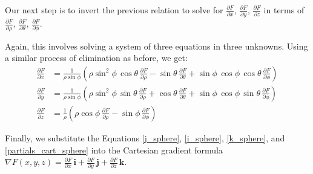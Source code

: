 {Our next step is to invert the previous relation to solve for $\frac{\partial F}{\partial x}$, $\frac{\partial F}{\partial y}$, $\frac{\partial F}{\partial z}$ in terms of $\frac{\partial F}{\partial \rho}$, $\frac{\partial F}{\partial \theta}$, $\frac{\partial F}{\partial \phi}$.

Again, this involves solving a system of three equations in three unknowns. Using a similar process of elimination as before, we get:
\begin{align}
 \frac{\partial F}{\partial x} &= \frac{1}{\rho\sin\phi}\left( \rho\sin^2\phi\,\cos\theta\,
  \frac{\partial F}{\partial \rho} - \sin\theta\,\frac{\partial F}{\partial \theta} + \sin\phi\,\cos\phi\,\cos\theta\,
  \frac{\partial F}{\partial \phi} \right)\\
 \frac{\partial F}{\partial y} &= \frac{1}{\rho\sin\phi}\left( \rho\sin^2\phi\,\sin\theta\,
  \frac{\partial F}{\partial \rho} + \cos\theta\,\frac{\partial F}{\partial \theta} + \sin\phi\,\cos\phi\,\sin\theta\,
  \frac{\partial F}{\partial \phi} \right)\\
 \frac{\partial F}{\partial z} &= \frac{1}{\rho}\left( \rho\cos\phi\,\frac{\partial F}{\partial \rho} -
  \sin\phi\,\frac{\partial F}{\partial \phi} \right)\label{partials_cart_sphere}
\end{align}

Finally, we substitute the Equations \eqref{j_sphere}, \eqref{i_sphere}, \eqref{k_sphere}, and \eqref{partials_cart_sphere} into the Cartesian gradient formula $\nabla F(x,y,z) = \frac{\partial F}{\partial x}\,\textbf{i} + \frac{\partial F}{\partial y}\,\textbf{j} + \frac{\partial F}{\partial z}\,\textbf{k}$.

}
